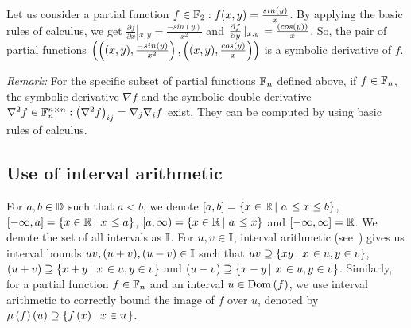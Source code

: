 %
\begin{example}
Let us consider a partial function $f\in\mathbb{F}_{2}: f(x,y) =
\frac{sin\left(y\right)}{x}$.  By applying the basic rules of calculus, we get
$\frac{\partial{f}}{\partial{x}}\left|_{x,y}\right. =
\frac{-sin(y)}{x^2}$ and
$\frac{\partial{f}}{\partial{y}}\left|_{x,y}\right. =
\frac{\left(cos(y)\right)}{x}$. So, the pair of partial functions $\left(
  \left((x,y),\frac{-sin(y)}{x^2}\right), \left((x,y), \frac{{cos(y)}}{x}\right) \right)$
  is a symbolic derivative of $f$.  
\end{example}
%
\emph{Remark:}  For the specific subset of partial functions $\mathbb{F}_{n}$
  defined above,
  if $f\in\mathbb{F}_{n}$, the symbolic derivative $\nabla{f}$ and the
symbolic double derivative $\nabla^2f\in\mathbb{F}_{n}^{n\times
n}: \left(\nabla^2 f\right)_{ij} =
\nabla_j\nabla_i f$ exist.  They can be computed by using
basic rules of calculus.
%
\subsection{Use of interval arithmetic}
For $a,b\in\mathbb{D}$ such that $a<b$, we denote $\left[a,b\right] =
\left\{x\in\mathbb{R}\left|~a\right.\leq x\leq b\right\}$, $[-\infty,a] = \left\{x\in\mathbb{R}\left|~x\right.\leq a\right\}$, $[a,\infty) = \left\{x\in\mathbb{R}\left|~a\right.\leq x\right\}$ and
  $[-\infty,\infty] = \mathbb{R}$.  We denote the set of all intervals as
  $\mathbb{I}$.  For $u,v\in\mathbb{I}$, interval arithmetic
  (see~\cite{bronnimann2006design}) gives us interval bounds
  $uv,(u+v),(u-v)\in\mathbb{I}$ such that $uv\supseteq\left\{xy\left|~x\right.\in
    u, y\in v\right\}$, $\left(u+v\right)\supseteq\left\{x+y\left|~x\right.\in u, y\in v\right\}$ and
  $\left(u-v\right)\supseteq\left\{x-y\left|~x\right.\in u, y\in v\right\}$.  Similarly, for a
  partial function $f\in \mathbb{F}_{n}$ and an interval $u\in\operatorname{Dom}\left(f\right)$, we use
  interval arithmetic to correctly bound the image of $f$ over $u$,
  denoted by $\mu\left(f\right)\left(u\right) \supseteq \left\{f\left(x\right)\left|~x\in u\right. \right\}$.


